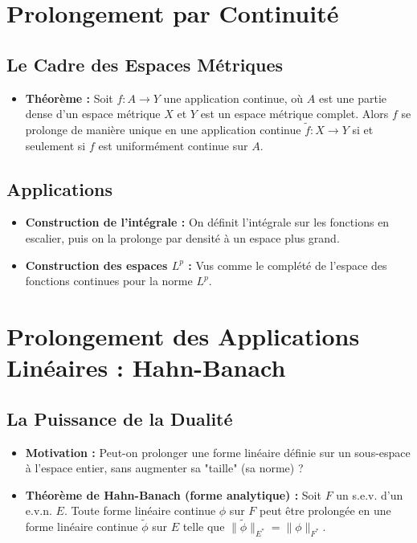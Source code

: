 \documentclass[12pt, a4paper, parskip=full]{report}
\theoremstyle{agregstyle}
\begin{document}
\section{Prolongement par Continuité}
\subsection{Le Cadre des Espaces Métriques}
\begin{itemize}
    \item \textbf{Théorème :} Soit $f: A \to Y$ une application continue, où $A$ est une partie dense d'un espace métrique $X$ et $Y$ est un espace métrique complet. Alors $f$ se prolonge de manière unique en une application continue $\tilde{f}: X \to Y$ si et seulement si $f$ est uniformément continue sur $A$.
\end{itemize}
\subsection{Applications}
\begin{itemize}
    \item \textbf{Construction de l'intégrale :} On définit l'intégrale sur les fonctions en escalier, puis on la prolonge par densité à un espace plus grand.
    \item \textbf{Construction des espaces $L^p$ :} Vus comme le complété de l'espace des fonctions continues pour la norme $L^p$.
\end{itemize}

\section{Prolongement des Applications Linéaires : Hahn-Banach}
\subsection{La Puissance de la Dualité}
\begin{itemize}
    \item \textbf{Motivation :} Peut-on prolonger une forme linéaire définie sur un sous-espace à l'espace entier, sans augmenter sa "taille" (sa norme) ?
    \item \textbf{Théorème de Hahn-Banach (forme analytique) :} Soit $F$ un s.e.v. d'un e.v.n. $E$. Toute forme linéaire continue $\phi$ sur $F$ peut être prolongée en une forme linéaire continue $\tilde{\phi}$ sur $E$ telle que $\|\tilde{\phi}\|_{E^*} = \|\phi\|_{F^*}$.
\end{itemize}
\end{document}

